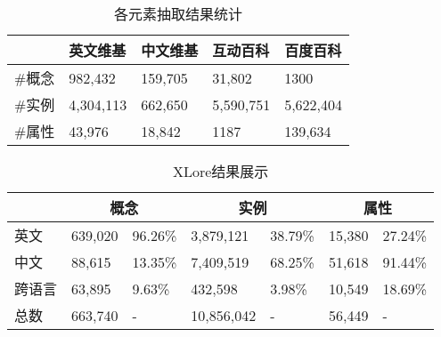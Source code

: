 \begin{table}[htb]
    \centering
  \begin{minipage}[t]{0.8\linewidth}
    \caption{各元素抽取结果统计}
    \label{tab:extract-result}
    \begin{tabularx}{\linewidth}{lXXXX}
        \toprule[1.5pt]
               & 英文维基    & 中文维基   & 互动百科    & 百度百科     \\ \midrule[1pt]
        \#概念 & 982,432   & 159,705  & 31,802    & 1300      \\ 
        \#实例 & 4,304,113 & 662,650  & 5,590,751 & 5,622,404 \\ 
        \#属性 & 43,976    & 18,842   & 1187      & 139,634   \\ 
        \bottomrule[1.5pt]
    \end{tabularx}
  \end{minipage}
\end{table}

\begin{table}[htb]
    \centering
  \begin{minipage}[t]{0.9\linewidth}
    \caption{XLore结果展示}
    \label{tab:xlore-result}
    \begin{tabularx}{\linewidth}{lXXXXXX} 
        \toprule[1.5pt]
        \multicolumn{1}{c}{} & \multicolumn{2}{c}{概念}     & \multicolumn{2}{c}{实例}                   & \multicolumn{2}{c}{属性}    \\ \midrule[1pt]
英文            & 639,020 & 96.26\%          & 3,879,121   & 38.79\%                & 15,380  & 27.24\%                \\ 
中文            & 88,615  & 13.35\%          & 7,409,519   & 68.25\%                & 51,618  & 91.44\%                \\ 
跨语言          & 63,895  & 9.63\%           & 432,598     & 3.98\%                 & 10,549  & 18.69\%                \\ 
总数           & 663,740 & {-}               & 10,856,042  & {-}                    & 56,449  & {-} \\
      \bottomrule[1.5pt]
    \end{tabularx}
  \end{minipage}
\end{table}

